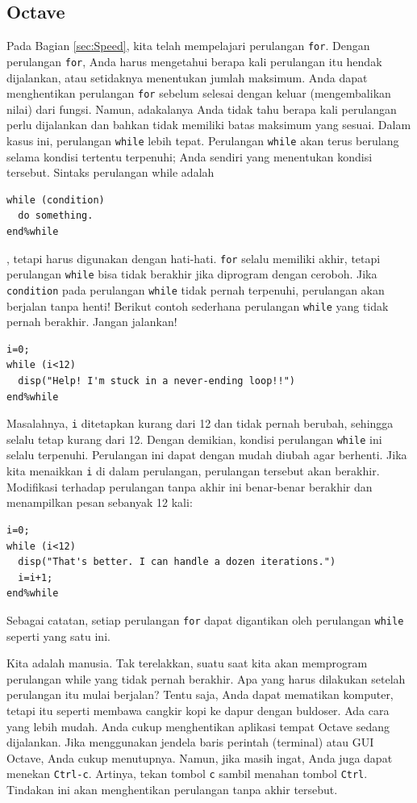 \subsection{Octave\label{subsec:WhileLoop}}

Pada Bagian \ref{sec:Speed}, kita telah mempelajari perulangan \texttt{for}.
Dengan perulangan \texttt{for}, Anda harus mengetahui berapa kali
perulangan itu hendak dijalankan, atau setidaknya menentukan jumlah
maksimum. Anda dapat menghentikan perulangan \texttt{for} sebelum
selesai dengan keluar (mengembalikan nilai) dari fungsi. Namun, adakalanya
Anda tidak tahu berapa kali perulangan perlu dijalankan dan bahkan
tidak memiliki batas maksimum yang sesuai. Dalam kasus ini, perulangan
\texttt{while} 
lebih tepat. Perulangan \texttt{while} akan terus berulang selama
kondisi tertentu terpenuhi; Anda sendiri yang menentukan kondisi tersebut.
Sintaks perulangan while adalah \begin{verbatim}
while (condition)
  do something. 
end%while
\end{verbatim}, tetapi harus digunakan dengan hati-hati. \texttt{for} selalu memiliki
akhir, tetapi perulangan \texttt{while} bisa tidak berakhir jika diprogram
dengan ceroboh. Jika \texttt{condition} pada perulangan \texttt{while}
tidak pernah terpenuhi, perulangan akan berjalan tanpa henti! Berikut
contoh sederhana perulangan \texttt{while} yang tidak pernah berakhir.
Jangan jalankan! \begin{verbatim}
i=0;
while (i<12)
  disp("Help! I'm stuck in a never-ending loop!!")
end%while
\end{verbatim} Masalahnya, \texttt{i} ditetapkan kurang dari 12 dan tidak pernah
berubah, sehingga selalu tetap kurang dari 12. Dengan demikian, kondisi
perulangan \texttt{while} ini selalu terpenuhi. Perulangan ini dapat
dengan mudah diubah agar berhenti. Jika kita menaikkan \texttt{i}
di dalam perulangan, perulangan tersebut akan berakhir. Modifikasi
terhadap perulangan tanpa akhir ini benar-benar berakhir dan menampilkan
pesan sebanyak 12 kali: \begin{verbatim}
i=0;
while (i<12)
  disp("That's better. I can handle a dozen iterations.")
  i=i+1;
end%while
\end{verbatim} Sebagai catatan, setiap perulangan \texttt{for} dapat digantikan
oleh perulangan \texttt{while} seperti yang satu ini. 

Kita adalah manusia. Tak terelakkan, suatu saat kita akan memprogram
perulangan while yang tidak pernah berakhir. Apa yang harus dilakukan
setelah perulangan itu mulai berjalan? Tentu saja, Anda dapat mematikan
komputer, tetapi itu seperti membawa cangkir kopi ke dapur dengan
buldoser. Ada cara yang lebih mudah. Anda cukup menghentikan aplikasi
tempat Octave sedang dijalankan. Jika menggunakan jendela baris perintah
(terminal) atau GUI Octave, Anda cukup menutupnya. Namun, jika masih
ingat, Anda juga dapat menekan \texttt{Ctrl-c}. Artinya, tekan tombol
\texttt{c} sambil menahan tombol \texttt{Ctrl}. Tindakan ini akan
menghentikan perulangan tanpa akhir tersebut.

